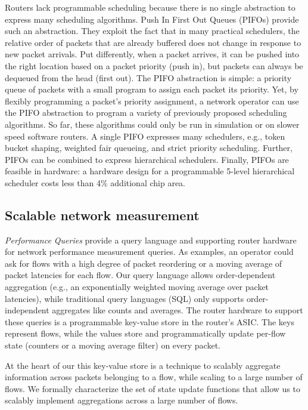 Routers lack programmable scheduling because there is no single abstraction to
express many scheduling algorithms. Push In First Out Queues (PIFOs) provide
such an abstraction. They exploit the fact that in many practical schedulers,
the relative order of packets that are already buffered does not change in
response to new packet arrivals. Put differently, when a packet arrives, it can
be pushed into the right location based on a packet priority (push in), but
packets can always be dequeued from the head (first out). The PIFO abstraction
is simple: a priority queue of packets with a small program to assign each
packet its priority. Yet, by flexibly programming a packet’s priority
assignment, a network operator can use the PIFO abstraction to program a
variety of previously proposed scheduling algorithms. So far, these algorithms
could only be run in simulation or on slower speed software routers.
A single PIFO expresses many schedulers, e.g., token bucket shaping, weighted
fair queueing, and strict priority scheduling. Further, PIFOs can be combined
to express hierarchical schedulers. Finally, PIFOs are feasible in hardware: a
hardware design for a programmable 5-level hierarchical scheduler costs less
than 4\% additional chip area.

\subsection{Scalable network measurement}

\textit{Performance Queries} provide a query language and supporting router
hardware for network performance measurement queries. As examples, an operator
could ask for flows with a high degree of packet reordering or a moving average
of packet latencies for each flow. Our query language allows order-dependent
aggregation (e.g., an exponentially weighted moving average over packet
latencies), while traditional query languages (\eg SQL) only supports
order-independent aggregates like counts and averages. The router hardware to
support these queries is a programmable key-value store in the router’s ASIC.
The keys represent flows, while the values store and programmatically update
per-flow state (\eg counters or a moving average filter) on every packet.

At the heart of our this key-value store is a technique to scalably aggregate
information across packets belonging to a flow, while scaling to a large number
of flows. We formally characterize the set of state update functions that allow
us to scalably implement aggregations across a large number of flows.

